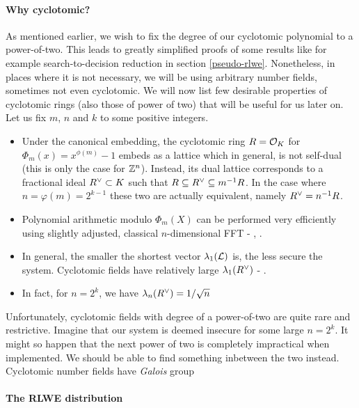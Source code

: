 \paragraph{Why cyclotomic?}\label{why?}
As mentioned earlier, we wish to fix the degree of our cyclotomic polynomial to a power-of-two. This leads to greatly simplified proofs of some results like for example search-to-decision reduction in section \ref{pseudo-rlwe}. Nonetheless, in places where it is not necessary, we will be using arbitrary number fields, sometimes not even cyclotomic. We will now list few desirable properties of cyclotomic rings (also those of power of two) that will be useful for us later on. Let us fix $m$, $n$ and $k$ to some positive integers.
\begin{itemize}
	\item Under the canonical embedding, the cyclotomic ring $R = \mathcal{O}_K$ for $\Phi_m(x) = x^{\phi(m)} - 1$ embeds as a lattice which in general, is not self-dual (this is only the case for $\mathbb{Z}^n$). Instead, its dual lattice corresponds to a fractional ideal $R^{\vee} \subset K$ such that $R \subseteq R^{\vee} \subseteq m^{-1}R$. In the case where $n = \varphi(m) =  2^{k-1}$ these two are actually equivalent, namely $R^{\vee} = n^{-1}R$. 
	\item Polynomial arithmetic modulo $\Phi_m(X)$ can be performed very efficiently using slightly adjusted, classical $n$-dimensional FFT - \cite{toolkit}, \cite{swift}.
	\item In general, the smaller the shortest vector $\lambda_1(\mathcal{L})$ is, the less secure the system. Cyclotomic fields have relatively large $\lambda_1(R^{\vee})$ - \cite{oracle}.
	\item In fact, for $n = 2^k$, we have $\lambda_n(R^{\vee}) = 1/\sqrt{n}$
		\iffalse
	\item They also have relatively small \textit{expansion factors} (roughly speaking it is the ratio of the size of the public key to the size of the secret key) as defined and explained in \cite{expansion}.
		\fi
\end{itemize}
Unfortunately, cyclotomic fields with degree of a power-of-two are quite rare and restrictive. Imagine that our system is deemed insecure for some large $n = 2^k$. It might so happen that the next power of two is completely impractical when implemented. We should be able to find something inbetween the two instead.
Cyclotomic number fields have \textit{Galois} group
\paragraph{The RLWE distribution}

